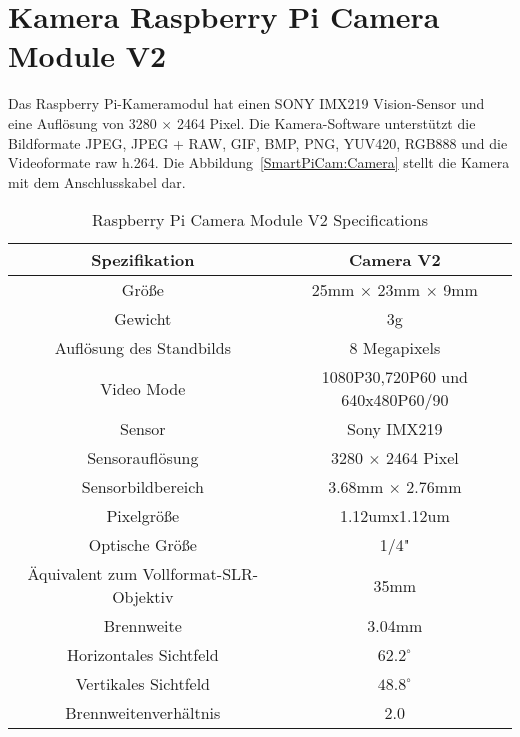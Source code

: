 %
%


\section{Kamera Raspberry Pi Camera Module V2}\label{SmartPiCAM:Kamera}

Das Raspberry Pi-Kameramodul hat einen SONY IMX219 Vision-Sensor und eine Auflösung von 3280 $\times$ 2464 Pixel. Die Kamera-Software unterstützt die Bildformate JPEG, JPEG + RAW, GIF, BMP, PNG, YUV420, RGB888 und die Videoformate raw h.264. \cite{RaspberryPiCam:2016}
Die Abbildung~\ref{SmartPiCam:Camera} stellt die Kamera mit dem Anschlusskabel dar.

\begin{table}[!htbp]
  \begin{center}
    \begin{tabular}{|c| c|} \hline
      Spezifikation                          & Camera V2\\  \hline\hline
      Größe                                  & 25mm $\times$ 23mm $\times$ 9mm \\  \hline
      Gewicht                                & 3g\\ \hline
      Auflösung des Standbilds               & 8 Megapixels\\ \hline
      Video Mode                             & 1080P30,720P60 und 640x480P60/90\\ \hline
      Sensor                                 & Sony IMX219 \\ \hline
      Sensorauflösung                        & 3280 $\times$ 2464 Pixel \\ \hline
      Sensorbildbereich                      & 3.68mm $\times$ 2.76mm\\ \hline
      Pixelgröße                             & 1.12umx1.12um\\\hline
      Optische Größe                         & 1/4"\\ \hline
      Äquivalent zum Vollformat-SLR-Objektiv & 35mm\\ \hline
      Brennweite                             & 3.04mm\\ \hline
      Horizontales Sichtfeld                 & $62.2^\circ$\\ \hline
      Vertikales Sichtfeld                   & $48.8^\circ$\\ \hline
      Brennweitenverhältnis                  & 2.0\\ \hline
   \end{tabular}
   \caption{Raspberry Pi Camera Module V2 Specifications \cite{RaspberryPiCam:2016}}
  
  \end{center}
\end{table}

